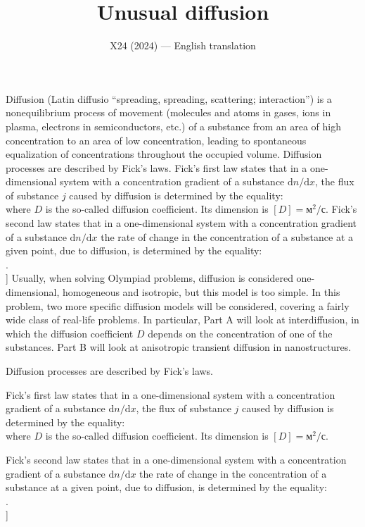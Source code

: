 \documentclass[11pt,a4paper]{article}
\title{\textbf{Unusual diffusion}}
\author{\normalsize X24 (2024) --- English translation}
\date{}
\begin{document}
\maketitle

Diffusion (Latin diffusio “spreading, spreading, scattering; interaction”) is a nonequilibrium process of movement (molecules and atoms in gases, ions in plasma, electrons in semiconductors, etc.) of a substance from an area of high concentration to an area of low concentration, leading to spontaneous equalization of concentrations throughout the occupied volume. Diffusion processes are described by Fick's laws. Fick's first law states that in a one-dimensional system with a concentration gradient of a substance $\mathrm dn{/}\mathrm dx$, the flux of substance $j$ caused by diffusion is determined by the equality: \\[j=-D\cdot\mathrm dn\{/\}\mathrm dx,\\]where $D$ is the so-called diffusion coefficient. Its dimension is $[D]=м^2/с$. Fick's second law states that in a one-dimensional system with a concentration gradient of a substance $\mathrm dn{/}\mathrm dx$ the rate of change in the concentration of a substance at a given point, due to diffusion, is determined by the equality: \\[\frac\{\partial\}\{\partial t\}n=\frac\{\partial\}\{\partial x\}\left[D\frac\{\partial n\}\{\partial x\}\right].\\] Usually, when solving Olympiad problems, diffusion is considered one-dimensional, homogeneous and isotropic, but this model is too simple. In this problem, two more specific diffusion models will be considered, covering a fairly wide class of real-life problems. In particular, Part A will look at interdiffusion, in which the diffusion coefficient $D$ depends on the concentration of one of the substances. Part B will look at anisotropic transient diffusion in nanostructures.

Diffusion processes are described by Fick's laws.

Fick's first law states that in a one-dimensional system with a concentration gradient of a substance $\mathrm dn{/}\mathrm dx$, the flux of substance $j$ caused by diffusion is determined by the equality: \\[j=-D\cdot\mathrm dn\{/\}\mathrm dx,\\]where $D$ is the so-called diffusion coefficient. Its dimension is $[D]=м^2/с$.

Fick's second law states that in a one-dimensional system with a concentration gradient of a substance $\mathrm dn{/}\mathrm dx$ the rate of change in the concentration of a substance at a given point, due to diffusion, is determined by the equality: \\[\frac\{\partial\}\{\partial t\}n=\frac\{\partial\}\{\partial x\}\left[D\frac\{\partial n\}\{\partial x\}\right].\\]
\end{document}
